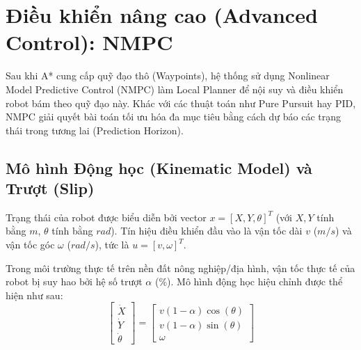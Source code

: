 \documentclass[12pt, a4paper]{article}
\begin{document}
\section{Điều khiển nâng cao (Advanced Control): NMPC}

Sau khi A* cung cấp quỹ đạo thô (Waypoints), hệ thống sử dụng Nonlinear Model Predictive Control (NMPC) làm Local Planner để nội suy và điều khiển robot bám theo quỹ đạo này. Khác với các thuật toán như Pure Pursuit hay PID, NMPC giải quyết bài toán tối ưu hóa đa mục tiêu bằng cách dự báo các trạng thái trong tương lai (Prediction Horizon).

\subsection{Mô hình Động học (Kinematic Model) và Trượt (Slip)}
Trạng thái của robot được biểu diễn bởi vector $x = [X, Y, \theta]^T$ (với $X, Y$ tính bằng $m$, $\theta$ tính bằng $rad$). Tín hiệu điều khiển đầu vào là vận tốc dài $v$ ($m/s$) và vận tốc góc $\omega$ ($rad/s$), tức là $u = [v, \omega]^T$.

Trong môi trường thực tế trên nền đất nông nghiệp/địa hình, vận tốc thực tế của robot bị suy hao bởi hệ số trượt $\alpha$ ($\%$). Mô hình động học hiệu chỉnh được thể hiện như sau:
\begin{equation}
    \begin{bmatrix} \dot{X} \\ \dot{Y} \\ \dot{\theta} \end{bmatrix} = 
    \begin{bmatrix} v (1-\alpha) \cos(\theta) \\ v (1-\alpha) \sin(\theta) \\ \omega \end{bmatrix}
\end{equation}
\end{document}
